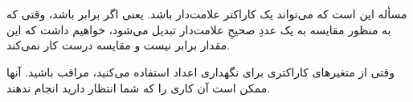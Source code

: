 \section{}
\paragraph{}\label{answer:8}
مسأله این است که  می‌تواند یک کاراکتر علامت‌دار باشد. یعنی اگر  برابر  باشد، وقتی که به منظور مقایسه به یک عددِ صحیحِ علامت‌دار تبدیل می‌شود، خواهیم داشت  که این مقدار برابر  نیست و مقایسه درست کار نمی‌کند.

وقتی از متغیرهای کاراکتری برای نگهداری اعداد استفاده می‌کنید، مراقب باشید. آنها ممکن است آن کاری را که شما انتظار دارید انجام ندهند.
